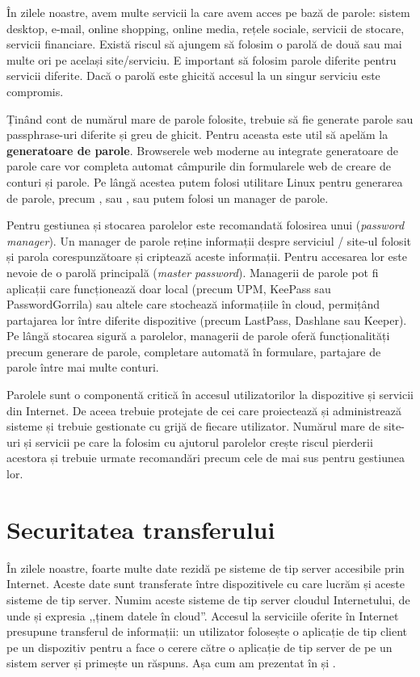 În zilele noastre, avem multe servicii la care avem acces pe bază de parole: sistem desktop, e-mail, online shopping, online media, rețele sociale, servicii de stocare, servicii financiare.
Există riscul să ajungem să folosim o parolă de două sau mai multe ori pe același site/serviciu.
E important să folosim parole diferite pentru servicii diferite.
Dacă o parolă este ghicită accesul la un singur serviciu este compromis.

Ținând cont de numărul mare de parole folosite, trebuie să fie generate parole sau passphrase-uri diferite și greu de ghicit.
Pentru aceasta este util să apelăm la \textbf{generatoare de parole}.
Browserele web moderne au integrate generatoare de parole care vor completa automat câmpurile din formularele web de creare de conturi și parole.
Pe lângă acestea putem folosi utilitare Linux pentru generarea de parole, precum ,  sau , sau putem folosi un manager de parole.

Pentru gestiunea și stocarea parolelor este recomandată folosirea unui  (\textit{password manager}).
Un manager de parole reține informații despre serviciul / site-ul folosit și parola corespunzătoare și criptează aceste informații.
Pentru accesarea lor este nevoie de o parolă principală (\textit{master password}).
Managerii de parole pot fi aplicații care funcționează doar local (precum UPM, KeePass sau PasswordGorrila) sau altele care stochează informațiile în cloud, permițând partajarea lor între diferite dispozitive (precum LastPass, Dashlane sau Keeper).
Pe lângă stocarea sigură a parolelor, managerii de parole oferă funcționalități precum generare de parole, completare automată în formulare, partajare de parole între mai multe conturi.

Parolele sunt o componentă critică în accesul utilizatorilor la dispozitive și servicii din Internet.
De aceea trebuie protejate de cei care proiectează și administrează sisteme și trebuie gestionate cu grijă de fiecare utilizator.
Numărul mare de site-uri și servicii pe care la folosim cu ajutorul parolelor crește riscul pierderii acestora și trebuie urmate recomandări precum cele de mai sus pentru gestiunea lor.

\section{Securitatea transferului}
\label{sec:sec:transfer}

În zilele noastre, foarte multe date rezidă pe sisteme de tip server accesibile prin Internet.
Aceste date sunt transferate între dispozitivele cu care lucrăm și aceste sisteme de tip server.
Numim aceste sisteme de tip server cloudul Internetului, de unde și expresia ,,ținem datele în cloud''.
Accesul la serviciile oferite în Internet presupune transferul de informații: un utilizator folosește o aplicație de tip client pe un dispozitiv pentru a face o cerere către o aplicație de tip server de pe un sistem server și primește un răspuns.
Așa cum am prezentat în  și .

